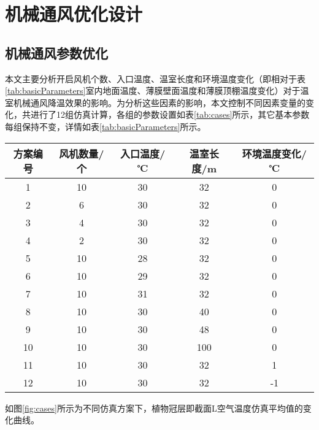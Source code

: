 \section{机械通风优化设计}
	\subsection{机械通风参数优化}
本文主要分析开启风机个数、入口温度、温室长度和环境温度变化（即相对于表\ref{tab:basicParameters}室内地面温度、薄膜壁面温度和薄膜顶棚温度变化）对于温室机械通风降温效果的影响。为分析这些因素的影响，本文控制不同因素变量的变化，共进行了12组仿真计算，各组的参数设置如表\ref{tab:cases}所示，其它基本参数每组保持不变，详情如表\ref{tab:basicParameters}所示。

		\begin{table}[!htbp]
  			\centering
  			\begin{tabular}{ccccc} \toprule
			方案编号 & 风机数量/个 & 入口温度/℃ & 温室长度/m & 环境温度变化/℃\\ \midrule
			1 & 10	 & 30 & 32 & 0\\
			2 & 6 & 30 & 32 & 0\\
			3 & 4 & 30 & 32 & 0\\
			4 & 2 & 30 & 32 & 0\\
			5 & 10 & 28 & 32 & 0\\
			6 & 10 & 29 & 32 & 0\\
			7 & 10 & 31 & 32 & 0\\
			8 & 10 & 30 & 40 & 0\\
			9 & 10 & 30 & 48 & 0\\
			10 & 10 & 30 & 100 & 0\\
			11 & 10 & 30 & 32 & 1\\
			12 & 10 & 30 & 32 & -1\\ \bottomrule
 			\end{tabular}
		\end{table}
	如图\ref{fig:cases}所示为不同仿真方案下，植物冠层即截面L空气温度仿真平均值的变化曲线。
	
